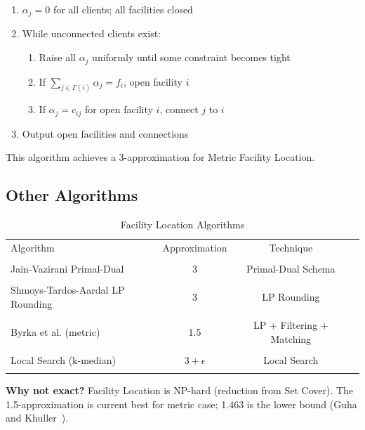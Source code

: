 \begin{algorithmdef}
\begin{enumerate}
    \item $\alpha_j = 0$ for all clients; all facilities closed
    \item While unconnected clients exist:
    \begin{enumerate}
        \item Raise all $\alpha_j$ uniformly until some constraint becomes tight
        \item If $\sum_{j \in \Gamma(i)} \alpha_j = f_i$, open facility $i$
        \item If $\alpha_j = c_{ij}$ for open facility $i$, connect $j$ to $i$
    \end{enumerate}
    \item Output open facilities and connections
\end{enumerate}
\end{algorithmdef}

\begin{theorem}
This algorithm achieves a 3-approximation for Metric Facility Location.
\end{theorem}

\subsection{Other Algorithms}

\begin{table}[H]
\centering
\caption{Facility Location Algorithms}
\begin{tabular}{lccc}
\toprule
Algorithm & Approximation & Technique \\\\
\midrule
Jain-Vazirani Primal-Dual & 3 & Primal-Dual Schema \\\\
Shmoys-Tardos-Aardal LP Rounding & 3 & LP Rounding \\\\
Byrka et al. (metric) & 1.5 & LP + Filtering + Matching \\\\
Local Search (k-median) & $3+\epsilon$ & Local Search \\\\
\bottomrule
\end{tabular}
\end{table}

\textbf{Why not exact?} Facility Location is NP-hard (reduction from Set Cover). The 1.5-approximation is current best for metric case; 1.463 is the lower bound (Guha and Khuller~\cite{guha-khuller99}).

